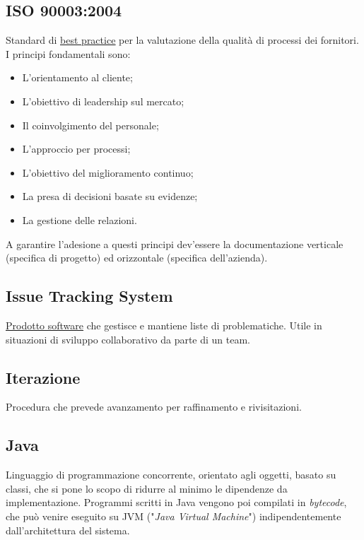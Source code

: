 	\subsection{ISO 90003:2004}
	\label{sec:iso90003}
	Standard di \underline{\hyperref[sec:bestpractice]{best practice}} per la valutazione della qualità di processi dei fornitori. I principi fondamentali sono:
	\begin{itemize}
	\item L'orientamento al cliente;
	\item L'obiettivo di leadership sul mercato;
	\item Il coinvolgimento del personale;
	\item L'approccio per processi;
	\item L'obiettivo del miglioramento continuo;
	\item La presa di decisioni basate su evidenze;
	\item La gestione delle relazioni.
	\end{itemize}
	A garantire l'adesione a questi principi dev'essere la documentazione verticale (specifica di progetto) ed orizzontale (specifica dell'azienda).

	\subsection{Issue Tracking System}
	\label{sec:issuetrack}
	\underline{\hyperref[sec:prodottosoftware]{Prodotto software}} che gestisce e mantiene liste di problematiche. Utile in situazioni di sviluppo collaborativo da parte di un team.

	\subsection{Iterazione}
	\label{sec:iterazione}
	Procedura che prevede avanzamento per raffinamento e rivisitazioni.\newpage

	\subsection{Java}
	\label{sec:java}
	Linguaggio di programmazione concorrente, orientato agli oggetti, basato su classi, che si pone lo scopo di ridurre al minimo le dipendenze da implementazione. Programmi scritti in Java vengono poi compilati in \emph{bytecode}, che può venire eseguito su JVM ("\emph{Java Virtual Machine}") indipendentemente dall'architettura del sistema.

